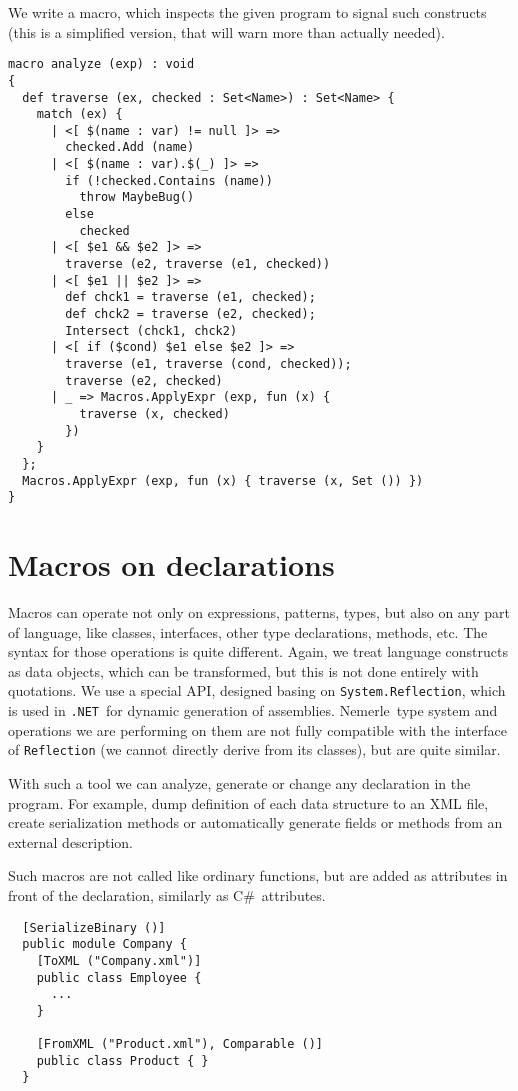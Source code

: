 \documentclass{llncs}
\newcommand{\net}[0]{{\tt .NET}}
\newcommand{\nem}[0]{Nemerle}
\newcommand{\cs}[0]{C\#}
\begin{document}
We write a macro, which inspects the given program to signal such constructs
(this is a simplified version, that will warn more than actually needed).
\begin{verbatim}
macro analyze (exp) : void 
{
  def traverse (ex, checked : Set<Name>) : Set<Name> {
    match (ex) {
      | <[ $(name : var) != null ]> => 
        checked.Add (name)
      | <[ $(name : var).$(_) ]> => 
        if (!checked.Contains (name)) 
          throw MaybeBug() 
        else 
          checked
      | <[ $e1 && $e2 ]> => 
        traverse (e2, traverse (e1, checked))
      | <[ $e1 || $e2 ]> => 
        def chck1 = traverse (e1, checked);
        def chck2 = traverse (e2, checked);
        Intersect (chck1, chck2)
      | <[ if ($cond) $e1 else $e2 ]> =>
        traverse (e1, traverse (cond, checked));
        traverse (e2, checked)
      | _ => Macros.ApplyExpr (exp, fun (x) { 
          traverse (x, checked) 
        })
    }
  };
  Macros.ApplyExpr (exp, fun (x) { traverse (x, Set ()) })
}
\end{verbatim} %

\section{Macros on declarations} \label{Declarations}
Macros can operate not only on expressions, patterns, types, but also on
any part of language, like classes, interfaces, other type declarations,
methods, etc. The syntax for those operations is quite different. Again, we
treat language constructs as data objects, which can be transformed, but
this is not done entirely with quotations. We use a special API, designed 
basing on \verb,System.Reflection,, which is used in \net\ for dynamic
generation of assemblies. \nem\ type system and operations we are performing
on them are not fully compatible with the interface of \verb,Reflection, 
(we cannot directly derive from its classes), but are quite similar.

With such a tool we can analyze, generate or change any declaration
in the program. For example, dump definition of each data structure 
to an XML file, create serialization methods or automatically
generate fields or methods from an external description.

Such macros are not called like ordinary functions, but are added as
attributes in front of the declaration, similarly as \cs\ attributes.

\begin{verbatim}
  [SerializeBinary ()] 
  public module Company {
    [ToXML ("Company.xml")] 
    public class Employee {
      ...
    }

    [FromXML ("Product.xml"), Comparable ()] 
    public class Product { }
  }
\end{verbatim}
\end{document}
